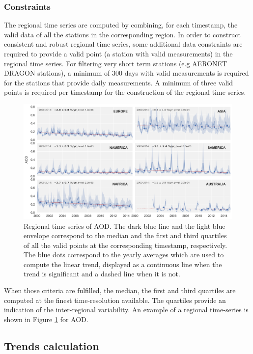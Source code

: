 \documentclass[journal abbreviation, manuscript]{copernicus}
\begin{document}
\subsubsection{Constraints}
The regional time series are computed by combining, for each timestamp, the valid data of all the stations in the corresponding region. In order to construct consistent and robust regional time series, some additional data constraints are required to provide a valid point (a station with valid measurements) in the regional time series. For filtering very short term stations (e.g AERONET DRAGON stations), a minimum of 300 days with valid measurements is required for the stations that provide daily measurements. A minimum of three valid points is required per timestamp for the construction of the regional time series.

\begin{figure}
 \includegraphics[width=16cm]{../scripts/figs/ts/panel-od550aer.png}
 \caption{Regional time series of AOD. The dark blue line and the light blue envelope correspond to the median and the first and third quartiles of all the valid points at the corresponding timestamp, respectively. The blue dots correspond to the yearly averages which are used to compute the linear trend, displayed as a continuous line when the trend is significant and a dashed line when it is not.}
 \label{fig:ts_aod}
\end{figure}

When those criteria are fulfilled, the median, the first and third quartiles are computed at the finest time-resolution available. The quartiles provide an indication of the inter-regional variability. An example of a regional time-series is shown in Figure \ref{fig:ts_aod} for AOD.


\subsection{Trends calculation}
\end{document}
